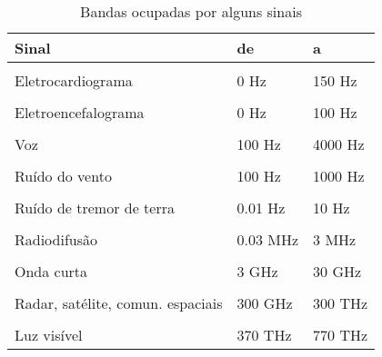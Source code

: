\begin{table}[H]
\centering
\caption{Bandas ocupadas por alguns sinais}
\label{tab:banda}
\smallskip
\begin{tabular}{|l|l|l|}
\hline
Sinal  & de & a\\[0.5ex]
\hline
&&\\[-2ex]
Eletrocardiograma& 0 Hz & 150 Hz \\[0.5ex]
\hline
&&\\[-2ex]
Eletroencefalograma& 0 Hz & 100 Hz\\[0.5ex]
\hline
&&\\[-2ex]
Voz & 100 Hz & 4000 Hz\\[0.5ex]
\hline
&&\\[-2ex]
Ruído do vento& 100 Hz &1000 Hz \\[0.5ex]
\hline
&&\\[-2ex]
Ruído de tremor de terra& 0.01 Hz& 10 Hz \\[0.5ex]
\hline
&&\\[-2ex]
Radiodifusão& 0.03 MHz& 3 MHz\\[0.5ex]
\hline
&&\\[-2ex]
Onda curta& 3 GHz & 30 GHz\\[0.5ex]
\hline
&&\\[-2ex]
Radar, satélite, comun. espaciais& 300 GHz & 300 THz \\[0.5ex]
\hline
&&\\[-2ex]
Luz visível& 370 THz& 770 THz \\[0.5ex]
\hline
\end{tabular}
\end{table}






























